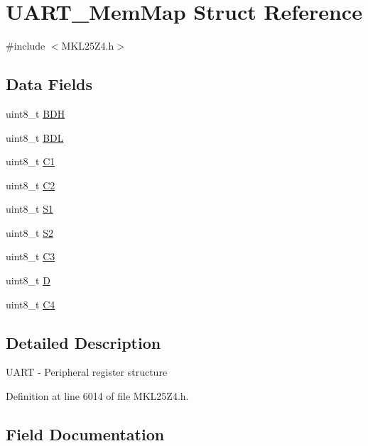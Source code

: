 \hypertarget{struct_u_a_r_t___mem_map}{}\section{U\+A\+R\+T\+\_\+\+Mem\+Map Struct Reference}
\label{struct_u_a_r_t___mem_map}


{\ttfamily \#include $<$M\+K\+L25\+Z4.\+h$>$}

\subsection*{Data Fields}
\begin{DoxyCompactItemize}
\item 
uint8\+\_\+t \hyperlink{struct_u_a_r_t___mem_map_a50621a015b23211a706aa74180fa4689}{B\+DH}
\item 
uint8\+\_\+t \hyperlink{struct_u_a_r_t___mem_map_ac846186ffd0e53fbac32cd57c6f9acc4}{B\+DL}
\item 
uint8\+\_\+t \hyperlink{struct_u_a_r_t___mem_map_ac2300c7c40e63ca712d0ec5180332f4b}{C1}
\item 
uint8\+\_\+t \hyperlink{struct_u_a_r_t___mem_map_a3e49aeb27f3613fd01a17a3c76e785b7}{C2}
\item 
uint8\+\_\+t \hyperlink{struct_u_a_r_t___mem_map_a7eb8df4e43194dbd9f1d9bd4ab742cca}{S1}
\item 
uint8\+\_\+t \hyperlink{struct_u_a_r_t___mem_map_a6107c55f4dba727e1a4e70f76acd7b20}{S2}
\item 
uint8\+\_\+t \hyperlink{struct_u_a_r_t___mem_map_a2e3cebfbfb9d96766397a8a102b8c29c}{C3}
\item 
uint8\+\_\+t \hyperlink{struct_u_a_r_t___mem_map_a3568c1640bf7dc0e1214cddcea1e8f0c}{D}
\item 
uint8\+\_\+t \hyperlink{struct_u_a_r_t___mem_map_a6f18d698404d3f130cab66610aa526de}{C4}
\end{DoxyCompactItemize}


\subsection{Detailed Description}
U\+A\+RT -\/ Peripheral register structure 

Definition at line 6014 of file M\+K\+L25\+Z4.\+h.



\subsection{Field Documentation}
